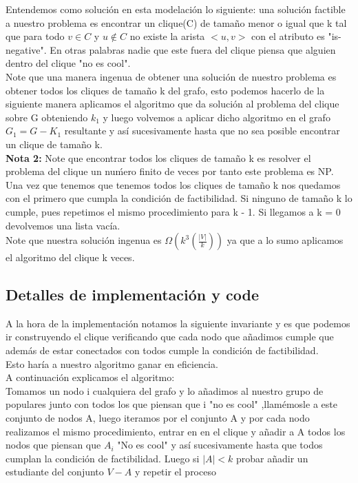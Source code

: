 \documentclass[sn-mathphys,Numbered]{sn-jnl}%
\theoremstyle{thmstyleone}%
\theoremstyle{thmstyletwo}%
\theoremstyle{thmstylethree}%
\begin{document}
Entendemos como solución en esta modelaci\'on lo siguiente: una solución factible a nuestro problema es encontrar un clique(C) de tama\~no menor o igual que k tal que para todo $v \in C$ y $u \notin C$ no existe la arista $<u,v>$ con el atributo es "is-negative". En otras palabras nadie que este fuera del clique piensa que alguien dentro del clique "no es cool".\\

Note que una manera ingenua de obtener una solución de nuestro problema es obtener todos los cliques de tama\~no k del grafo, esto podemos hacerlo de la siguiente manera aplicamos el algoritmo que da solución al problema del clique sobre G obteniendo $k_1$ y luego volvemos a aplicar dicho algoritmo en el grafo $G_1 = G - K_1$ resultante y así sucesivamente hasta que no sea posible encontrar un clique de tama\~no k.\\ 
\textbf{Nota 2:} Note que encontrar todos los cliques de tama\~no k es resolver el problema del clique un nu\'mero finito de veces por tanto este problema es NP.\\
Una vez que tenemos que tenemos todos los cliques de tama\~no k nos quedamos con el primero que cumpla la condición de factibilidad. Si ninguno de tama\~no k lo cumple, pues repetimos el mismo procedimiento para k - 1. Si llegamos a k = 0 devolvemos una lista vacía.\\
Note que nuestra solución ingenua es $\Omega (k^3(\frac{|V|}{k})) $ ya que a lo sumo aplicamos el algoritmo del clique k veces.
\subsection*{Detalles de implementación y code}
A la hora de la implementación notamos la siguiente invariante y es que podemos ir construyendo el clique verificando que cada nodo que a\~nadimos cumple que adem\'as de estar conectados con todos cumple la condición de factibilidad.\\
Esto har\'ia a nuestro algoritmo ganar en eficiencia.\\
A continuaci\'on explicamos el algoritmo: \\ 
Tomamos un nodo i cualquiera del grafo y lo a\~nadimos al nuestro grupo de populares junto con todos los que piensan que i "no es cool" ,llamémosle a este conjunto de nodos A, luego iteramos por el conjunto A y por cada nodo realizamos el mismo procedimiento, entrar en en el clique y a\~nadir a A todos los nodos que piensan que $A_i$ "No es cool" y así sucesivamente hasta que todos cumplan la condici\'on de factibilidad. Luego si $|A| < k$ probar añadir un estudiante del conjunto $V - A$ y repetir el proceso\\
\end{document}
